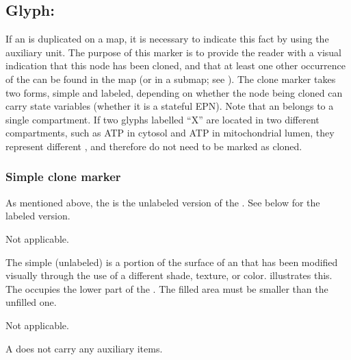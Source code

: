 
\subsection{Glyph: }
\label{sec:cloneMarker}

If an  is duplicated on a map, it is necessary to indicate this fact by using the  auxiliary unit.  The purpose of this marker is to provide the reader with a visual indication that this node has been cloned, and that at least one other occurrence of the  can be found in the map (or in a submap; see ).  The clone marker takes two forms, simple and labeled, depending on whether the node being cloned can carry state variables (\ie whether it is a stateful EPN). Note that an  belongs to a single compartment. If two glyphs labelled ``X'' are located in two different compartments, such as ATP in cytosol and ATP in mitochondrial lumen, they represent different , and therefore do not need to be marked as cloned.


\subsubsection{Simple clone marker}

As mentioned above, the  is the unlabeled version of the .  See below for the labeled version.


\begin{glyphDescription}

\glyphSboTerm Not applicable.

\glyphContainer The simple (unlabeled)  is a portion of the surface of an  that has been modified visually through the use of a different shade, texture, or color.   illustrates this.  The  occupies the lower part of the . The filled area must be smaller than the unfilled one.

\glyphLabel Not applicable.

\glyphAux A  does not carry any auxiliary items.

\end{glyphDescription}

